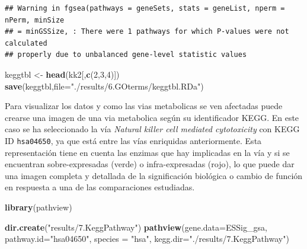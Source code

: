 \documentclass[
]{article}
\newenvironment{Shaded}{\begin{snugshade}}{\end{snugshade}}
\newcommand{\DataTypeTok}[1]{\textcolor[rgb]{0.13,0.29,0.53}{#1}}
\newcommand{\DecValTok}[1]{\textcolor[rgb]{0.00,0.00,0.81}{#1}}
\newcommand{\KeywordTok}[1]{\textcolor[rgb]{0.13,0.29,0.53}{\textbf{#1}}}
\newcommand{\NormalTok}[1]{#1}
\newcommand{\StringTok}[1]{\textcolor[rgb]{0.31,0.60,0.02}{#1}}
\begin{document}
\begin{verbatim}
## Warning in fgsea(pathways = geneSets, stats = geneList, nperm = nPerm, minSize
## = minGSSize, : There were 1 pathways for which P-values were not calculated
## properly due to unbalanced gene-level statistic values
\end{verbatim}

\begin{Shaded}
\begin{Highlighting}[]
\NormalTok{keggtbl <-}\StringTok{ }\KeywordTok{head}\NormalTok{(kk2[,}\KeywordTok{c}\NormalTok{(}\DecValTok{2}\NormalTok{,}\DecValTok{3}\NormalTok{,}\DecValTok{4}\NormalTok{)])}
\KeywordTok{save}\NormalTok{(keggtbl,}\DataTypeTok{file=}\StringTok{"./results/6.GOterms/keggtbl.RDa"}\NormalTok{)}
\end{Highlighting}
\end{Shaded}

Para visualizar los datos y como las vias metabolicas se ven afectadas
puede crearse una imagen de una via metabolica según su identificador
KEGG. En este caso se ha seleccionado la vía \emph{Natural killer cell
mediated cytotoxicity} con KEGG ID \texttt{hsa04650}, ya que está entre
las vías enriquidas anteriormente. Esta representación tiene en cuenta
las enzimas que hay implicadas en la vía y si se encuentran
sobre-expresadas (verde) o infra-expresadas (rojo), lo que puede dar una
imagen completa y detallada de la significación biológica o cambio de
función en respuesta a una de las comparaciones estudiadas.

\begin{Shaded}
\begin{Highlighting}[]
\KeywordTok{library}\NormalTok{(pathview)}
\end{Highlighting}
\end{Shaded}

\begin{Shaded}
\begin{Highlighting}[]
\KeywordTok{dir.create}\NormalTok{(}\StringTok{"results/7.KeggPathway"}\NormalTok{)}
\KeywordTok{pathview}\NormalTok{(}\DataTypeTok{gene.data=}\NormalTok{ESSig_gsa, }\DataTypeTok{pathway.id=}\StringTok{"hsa04650"}\NormalTok{, }\DataTypeTok{species =} \StringTok{"hsa"}\NormalTok{,}
         \DataTypeTok{kegg.dir=}\StringTok{"./results/7.KeggPathway"}\NormalTok{)}
\end{Highlighting}
\end{Shaded}
\end{document}
